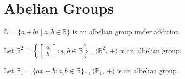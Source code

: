 \section{Abelian Groups}

\begin{eg}
    $\mathbb{C} = \{a + bi \mid a, b \in \mathbb{R}\}$ is an albelian group under addition.
\end{eg}

\begin{eg}
    Let $\mathbb{R}^2 = \left\{ \begin{bmatrix} a \\ b \end{bmatrix} : a, b \in \mathbb{R} \right\}$
    , $(\mathbb{R}^2$, $+)$ is an albelian group.
\end{eg}

\begin{eg}
    Let $\mathbb{P}_1 = \{ax + b : a, b \in \mathbb{R}\}$.
    , $(\mathbb{P}_1$, $+)$ is an albelian group.
\end{eg}

